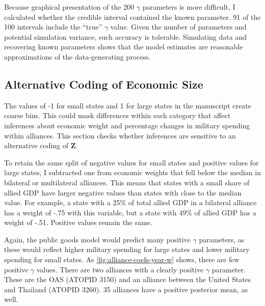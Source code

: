 \documentclass[12pt]{article}
\begin{document}
Because graphical presentation of the 200 $\gamma$ parameters is more difficult, I calculated whether the credible interval contained the known parameter. 
91 of the 100 intervals include the ``true'' $\gamma$ value. 
Given the number of parameters and potential simulation variance, such accuracy is tolerable. 
Simulating data and recovering known parameters shows that the model estimates are reasonable approximations of the data-generating process. 


\subsection{Alternative Coding of Economic Size}


The values of -1 for small states and 1 for large states in the manuscript create coarse bins. 
This could mask differences within each category that affect inferences about economic weight and percentage changes in military spending within alliances. 
This section checks whether inferences are sensitive to an alternative coding of $\textbf{Z}$. 


To retain the same split of negative values for small states and positive values for large states, I subtracted one from economic weights that fell below the median in bilateral or multilateral alliances. 
This means that states with a small share of allied GDP have larger negative values than states with close to the median value. 
For example, a state with a 25\% of total allied GDP  in a bilateral alliance has a weight of -.75 with this variable, but a state with 49\% of allied GDP has a weight of -.51. 
Positive values remain the same.


Again, the public goods model would predict many positive $\gamma$ parameters, as these would reflect higher military spending for large states and lower military spending for small states. 
As \autoref{fig:alliance-coefs-year-w} shows, there are few positive $\gamma$ values.  
There are two alliances with a clearly positive $\gamma$ parameter. 
These are the OAS (ATOPID 3150) and an alliance between the United States and Thailand (ATOPID 3260). 
35 alliances have a positive posterior mean, as well. 
\end{document}
